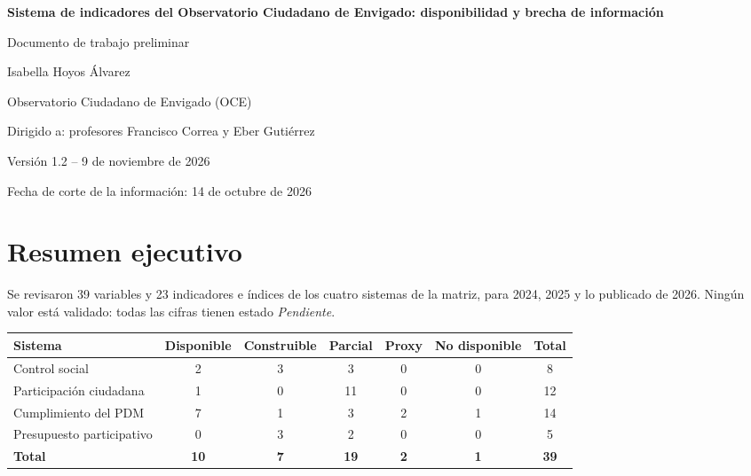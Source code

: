 \documentclass[11pt,letterpaper]{article}
\begin{document}
\hypersetup{pageanchor=false}
\begin{titlepage}
\centering
\vspace*{3cm}
{\LARGE\bfseries Sistema de indicadores del Observatorio Ciudadano de Envigado: disponibilidad y brecha de información\par}
\vspace{1.5cm}
{\large Documento de trabajo preliminar\par}
\vspace{2cm}
{\large Isabella Hoyos Álvarez\par}
\vspace{0.5cm}
{\large Observatorio Ciudadano de Envigado (OCE)\par}
\vspace{2cm}
{\large Dirigido a: profesores Francisco Correa y Eber Gutiérrez\par}
\vfill
{\large Versión 1.2 -- 9 de noviembre de 2026\par}
\vspace{0.3cm}
{\large Fecha de corte de la información: 14 de octubre de 2026\par}
\end{titlepage}
\hypersetup{pageanchor=true}

\tableofcontents
\clearpage


\section{Resumen ejecutivo}

Se revisaron 39 variables y 23 indicadores e índices de los cuatro sistemas de la matriz, para 2024, 2025 y lo publicado de 2026. Ningún valor está validado: todas las cifras tienen estado \emph{Pendiente}.

\begin{center}\small\begin{tabular}{lcccccc}\toprule

\textbf{Sistema} & \textbf{\cellcolor{cverde}Disponible} & \textbf{\cellcolor{camarillo}Construible} & \textbf{\cellcolor{camarillo}Parcial} & \textbf{\cellcolor{cnaranja}Proxy} & \textbf{\cellcolor{crojo}No disponible} & \textbf{Total} \\ \midrule

Control social & 2 & 3 & 3 & 0 & 0 & 8 \\
Participación ciudadana & 1 & 0 & 11 & 0 & 0 & 12 \\
Cumplimiento del PDM & 7 & 1 & 3 & 2 & 1 & 14 \\
Presupuesto participativo & 0 & 3 & 2 & 0 & 0 & 5 \\ \midrule

\textbf{Total} & \textbf{10} & \textbf{7} & \textbf{19} & \textbf{2} & \textbf{1} & \textbf{39} \\ \bottomrule\end{tabular}\end{center}
\end{document}
